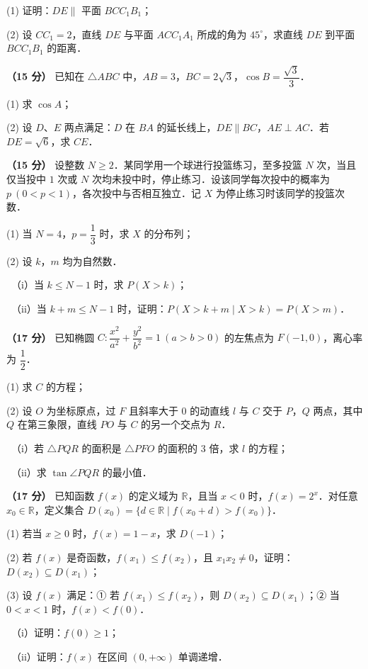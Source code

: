 \begin{center}\end{center}

  (1) 证明：$DE\parallel$ 平面 $BCC_1B_1$；

  (2) 设 $CC_1=2$，直线 $DE$ 与平面 $ACC_1A_1$ 所成的角为 $45^\circ$，求直线 $DE$ 到平面 $BCC_1B_1$ 的距离．

\textbf{（15 分）} 已知在 $\triangle ABC$ 中，$AB=3$，$BC=2\sqrt{3}$，$\cos B=\dfrac{\sqrt{3}}{3}$．

  (1) 求 $\cos A$；

  (2) 设 $D$、$E$ 两点满足：$D$ 在 $BA$ 的延长线上，$DE\parallel BC$，$AE\perp AC$．若 $DE=\sqrt{6}$，求 $CE$．

\textbf{（15 分）} 设整数 $N\ge 2$．某同学用一个球进行投篮练习，至多投篮 $N$ 次，当且仅当投中 $1$ 次或 $N$ 次均未投中时，停止练习．设该同学每次投中的概率为 $p\ (0<p<1)$，各次投中与否相互独立．记 $X$ 为停止练习时该同学的投篮次数．

  (1) 当 $N=4$，$p=\dfrac{1}{3}$ 时，求 $X$ 的分布列；

  (2) 设 $k$，$m$ 均为自然数．

  　（i）当 $k\le N-1$ 时，求 $P(X>k)$；

  　（ii）当 $k+m\le N-1$ 时，证明：$P(X>k+m\mid X>k)=P(X>m)$．

\textbf{（17 分）} 已知椭圆 $C:\dfrac{x^2}{a^2}+\dfrac{y^2}{b^2}=1\ (a>b>0)$ 的左焦点为 $F(-1,0)$，离心率为 $\dfrac{1}{2}$．

  (1) 求 $C$ 的方程；

  (2) 设 $O$ 为坐标原点，过 $F$ 且斜率大于 $0$ 的动直线 $l$ 与 $C$ 交于 $P$，$Q$ 两点，其中 $Q$ 在第三象限，直线 $PO$ 与 $C$ 的另一个交点为 $R$．

  　（i）若 $\triangle PQR$ 的面积是 $\triangle PFO$ 的面积的 $3$ 倍，求 $l$ 的方程；

  　（ii）求 $\tan\angle PQR$ 的最小值．

\textbf{（17 分）} 已知函数 $f(x)$ 的定义域为 $\mathbb{R}$，且当 $x<0$ 时，$f(x)=2^{x}$．对任意 $x_0\in\mathbb{R}$，定义集合 $D(x_0)=\{d\in\mathbb{R}\mid f(x_0+d)>f(x_0)\}$．

  (1) 若当 $x\ge 0$ 时，$f(x)=1-x$，求 $D(-1)$；

  (2) 若 $f(x)$ 是奇函数，$f(x_1)\le f(x_2)$，且 $x_1x_2\ne 0$，证明：$D(x_2)\subseteq D(x_1)$；

  (3) 设 $f(x)$ 满足：① 若 $f(x_1)\le f(x_2)$，则 $D(x_2)\subseteq D(x_1)$；② 当 $0<x<1$ 时，$f(x)<f(0)$．

  　（i）证明：$f(0)\ge 1$；

  　（ii）证明：$f(x)$ 在区间 $(0,+\infty)$ 单调递增．

\par\medskip


